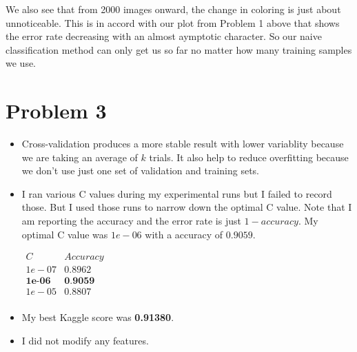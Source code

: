\documentclass{article}
\begin{document}
We also see that from 2000 images onward, the change in coloring is just about unnoticeable. This is in accord with our plot from Problem 1 above that shows the error rate decreasing with an almost aymptotic character. So our naive classification method can only get us so far no matter how many training samples we use.


\section*{Problem 3}
\begin{itemize}
\item Cross-validation produces a more stable result with lower variablity because we are taking an average of $k$ trials. It also help to reduce overfitting because we don't use just one set of validation and training sets. 
\item I ran various C values during my experimental runs but I failed to record those. But I used those runs to narrow down the optimal C value. Note that I am reporting the accuracy and the error rate is just $1-accuracy$. My optimal C value was $1e-06$ with a accuracy of $0.9059$.
  \begin{center}
    $\begin{array}{cc}
       C              & Accuracy       \\
       1e-07          & 0.8962         \\
       \textbf{1e-06} & \textbf{0.9059}\\
       1e-05          & 0.8807         \\
    \end{array}$
  \end{center}
  
\item My best Kaggle score was \textbf{0.91380}.
  \item I did not modify any features.
\end{itemize}
\end{document}
